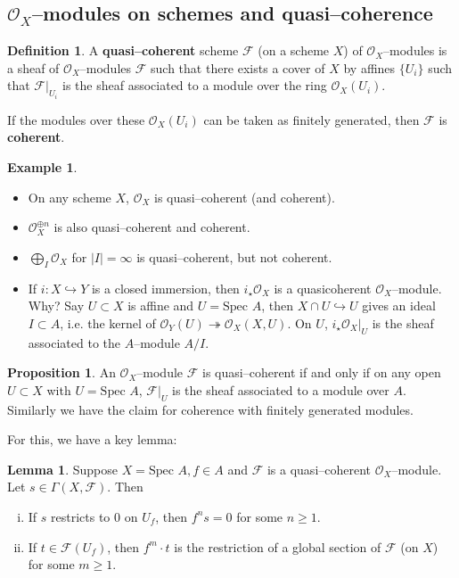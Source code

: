 \documentclass{article}
\theoremstyle{definition}
\newtheorem{lemma}[theorem]{Lemma}
\newtheorem{prop}[theorem]{Proposition}
\newtheorem{example}{Example}[section]
\newtheorem{defn}{Definition}[section]
\begin{document}
\subsection{$\mathcal{O}_X$--modules on schemes and quasi--coherence}
\begin{defn}
    A \textbf{quasi--coherent} scheme $\mathcal{F}$ (on a scheme $X$) of $\mathcal{O}_X$--modules is a sheaf of $\mathcal{O}_X$--modules $\mathcal{F}$ such that there exists a cover of $X$ by affines $\{U_i\}$ such that $\mathcal{F}|_{U_i}$ is the sheaf associated to a module over the ring $\mathcal{O}_X(U_i)$.
    \vspace{1mm}
     
    If the modules over these $\mathcal{O}_X(U_i)$ can be taken as finitely generated, then $\mathcal{F}$ is \textbf{coherent}.
\end{defn}
\begin{example}
\begin{itemize}
    \item On any scheme $X$, $\mathcal{O}_X$ is quasi--coherent (and coherent).
    \item $\mathcal{O}_X^{\oplus n}$ is also quasi--coherent and coherent.
    \item $\bigoplus_I \mathcal{O}_X$ for $|I|=\infty$ is quasi--coherent, but not coherent.
    \item If $i:X \hookrightarrow Y$ is a closed immersion, then $i_{\star}\mathcal{O}_X$ is a quasicoherent $\mathcal{O}_X$--module. Why? Say $U \subset X$ is affine and $U=\text{Spec }A$, then $X \cap U \hookrightarrow U$ gives an ideal $I \subset A$, i.e. the kernel of $\mathcal{O}_Y(U) \twoheadrightarrow \mathcal{O}_X(X,U)$. On $U$, $i_{\star}\mathcal{O}_X |_U$ is the sheaf associated to the $A$--module $A/I$. 
\end{itemize}    
\end{example}
\begin{prop}\label{prop5.1}
    An $\mathcal{O}_X$--module $\mathcal{F}$ is quasi--coherent if and only if on any open $U \subset X$ with $U= \text{Spec }A$, $\mathcal{F}|_U$ is the sheaf associated to a module over $A$.
    Similarly we have the claim for coherence with finitely generated modules.
\end{prop}
For this, we have a key lemma:
\begin{lemma}\label{lemma5.2}
    Suppose $X = \text{Spec }A, f \in A$ and $\mathcal{F}$ is a quasi--coherent $\mathcal{O}_X$--module. Let $s \in \Gamma(X,\mathcal{F})$. Then
    \begin{enumerate}[(i)]
        \item If $s$ restricts to $0$ on $U_f$, then $f^n s = 0$ for some $n\ge 1$.
        \item If $t \in \mathcal{F}(U_f)$, then $f^m \cdot t$ is the restriction of a global section of $\mathcal{F}$ (on $X$) for some $m\ge 1$.
    \end{enumerate}
\end{lemma}
\end{document}

